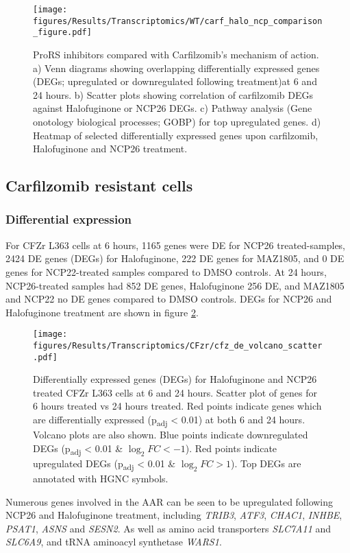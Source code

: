 \begin{figure}[p]
\centering
\texttt{[image: figures/Results/Transcriptomics/WT/carf\_halo\_ncp\_comparison\_figure.pdf]}
\caption[ProRS inhibitors compared with Carfilzomib's mechanism of action]{ProRS inhibitors compared with Carfilzomib's mechanism of action.
a) Venn diagrams showing overlapping differentially expressed genes (DEGs; upregulated or downregulated following treatment)at 6 and 24 hours.
b) Scatter plots showing correlation of carfilzomib DEGs against Halofuginone or NCP26 DEGs.
c) Pathway analysis (Gene onotology biological processes; GOBP) for top upregulated genes.
d) Heatmap of selected differentially expressed genes upon carfilzomib, Halofuginone and NCP26 treatment.
}
\label{fig:wt_carf_compare}
\end{figure}

\clearpage
\subsection{Carfilzomib resistant cells}

\subsubsection{Differential expression}
For CFZr L363 cells at 6 hours, 1165 genes were DE for NCP26 treated-samples, 2424 DE genes (DEGs) for Halofuginone, 222 DE genes for MAZ1805, and 0 DE genes for NCP22-treated samples compared to DMSO controls.
At 24 hours, NCP26-treated samples had 852 DE genes, Halofuginone 256 DE, and MAZ1805 and NCP22 no DE genes compared to DMSO controls.
DEGs for NCP26 and Halofuginone treatment are shown in figure \ref{fig:cfz_de}.
\begin{figure}[htb]
\centering
\texttt{[image: figures/Results/Transcriptomics/CFzr/cfz\_de\_volcano\_scatter.pdf]}
\caption[Differentially expressed genes CFZr L363 cells]{Differentially expressed genes (DEGs) for Halofuginone and NCP26 treated CFZr L363 cells at 6 and 24 hours.
Scatter plot of genes for 6 hours treated vs 24 hours treated.
Red points indicate genes which are differentially expressed (p\textsubscript{adj} < 0.01) at both 6 and 24 hours.
Volcano plots are also shown.
Blue points indicate downregulated DEGs (p\textsubscript{adj} < 0.01 \& $\log_{2}FC < -1$).
Red points indicate upregulated DEGs (p\textsubscript{adj} < 0.01 \& $\log_{2}FC > 1$).
Top DEGs are annotated with HGNC symbols.
}
\label{fig:cfz_de}
\end{figure}
Numerous genes involved in the AAR can be seen to be upregulated following NCP26 and Halofuginone treatment, including \textit{TRIB3}, \textit{ATF3}, \textit{CHAC1}, \textit{INHBE}, \textit{PSAT1}, \textit{ASNS} and \textit{SESN2}.
As well as amino acid transporters \textit{SLC7A11} and \textit{SLC6A9}, and tRNA aminoacyl synthetase \textit{WARS1}.

